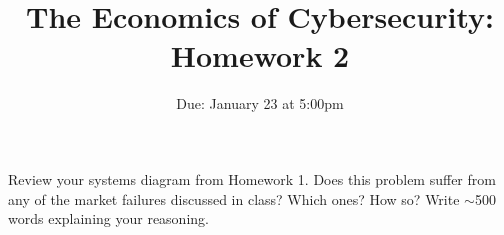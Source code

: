 \documentclass[11pt]{article}
\title{The Economics of Cybersecurity: Homework 2}
\date{Due: January 23 at 5:00pm}
\author{}
\begin{document}
\maketitle

\section{}

Review your systems diagram from Homework 1. Does this problem suffer from any of the market failures discussed in class? Which ones? How so? Write $\sim$500 words explaining your reasoning. 
\end{document}

